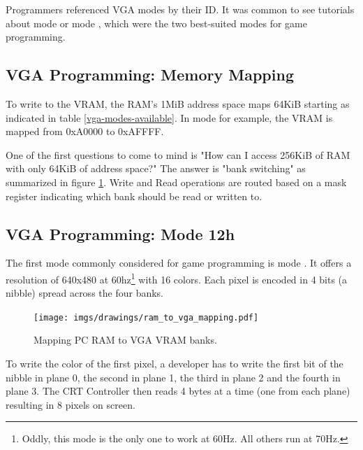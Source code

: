 \documentclass[book.tex]{subfiles}
\begin{document}
 Programmers referenced VGA modes by their ID. It was common to see tutorials about mode  or mode , which were the two best-suited modes for game programming.


 \subsection{VGA Programming: Memory Mapping}
To write to the VRAM, the RAM's 1MiB address space maps 64KiB starting as indicated in table \ref{vga-modes-available}. In mode  for example, the VRAM is mapped from 0xA0000 to 0xAFFFF.\\
\par One of the first questions to come to mind is "How can I access 256KiB of RAM with only 64KiB of address space?" The answer is "bank switching" as summarized in figure \ref{ram_to_vga_mapping}. Write and Read operations are routed based on a mask register indicating which bank should be read or written to. \\
\par

 \subsection{VGA Programming: Mode 12h}
 The first mode commonly considered for game programming is mode . It offers a resolution of 640x480 at 60hz\footnote{Oddly, this mode is the only one to work at 60Hz. All others run at 70Hz.} with 16 colors. Each pixel is encoded in 4 bits (a nibble) spread across the four banks.\\
\par



 \begin{figure}[H]
\centering
  
      \texttt{[image: imgs/drawings/ram\_to\_vga\_mapping.pdf]}
    \label{ram_to_vga_mapping}
\caption{Mapping PC RAM to VGA VRAM banks.}
\end{figure}
\par
 To write the color of the first pixel, a developer has to write the first bit of the nibble in plane 0, the second in plane 1, the third in plane 2 and the fourth in plane 3. The CRT Controller then reads 4 bytes at a time (one from each plane) resulting in 8 pixels on screen.\\
\par
 
\end{document}
